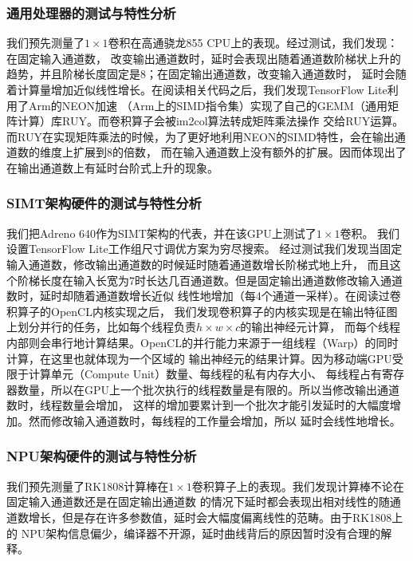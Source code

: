 \subsubsection{通用处理器的测试与特性分析}
我们预先测量了$1\times 1$卷积在高通骁龙855 CPU上的表现。经过测试，我们发现：在固定输入通道数，
改变输出通道数时，延时会表现出随着通道数阶梯状上升的趋势，并且阶梯长度固定是8；在固定输出通道数，改变输入通道数时，
延时会随着计算量增加近似线性增长。在阅读相关代码之后，我们发现TensorFlow Lite利用了Arm的NEON加速
（Arm上的SIMD指令集）实现了自己的GEMM（通用矩阵计算）库RUY。而卷积算子会被im2col算法转成矩阵乘法操作
交给RUY运算。而RUY在实现矩阵乘法的时候，为了更好地利用NEON的SIMD特性，会在输出通道数的维度上扩展到8的倍数，
而在输入通道数上没有额外的扩展。因而体现出了在输出通道数上有延时台阶式上升的现象。

\subsubsection{SIMT架构硬件的测试与特性分析}
我们把Adreno 640作为SIMT架构的代表，并在该GPU上测试了$1\times 1$卷积。
我们设置TensorFlow Lite工作组尺寸调优方案为穷尽搜索。
经过测试我们发现当固定输入通道数，修改输出通道数的时候延时随着通道数增长阶梯式地上升，
而且这个阶梯长度在输入长宽为7时长达几百通道数。但是固定输出通道数修改输入通道数时，延时却随着通道数增长近似
线性地增加（每4个通道一采样）。在阅读过卷积算子的OpenCL内核实现之后，
我们发现卷积算子的内核实现是在输出特征图上划分并行的任务，比如每个线程负责$h\times w\times c$的输出神经元计算，
而每个线程内部则会串行地计算结果。OpenCL的并行能力来源于一组线程（Warp）的同时计算，在这里也就体现为一个区域的
输出神经元的结果计算。因为移动端GPU受限于计算单元（Compute Unit）数量、每线程的私有内存大小、
每线程占有寄存器数量，所以在GPU上一个批次执行的线程数量是有限的。所以当修改输出通道数时，线程数量会增加，
这样的增加要累计到一个批次才能引发延时的大幅度增加。然而修改输入通道数时，每线程的工作量会增加，所以
延时会线性地增长。

\subsubsection{NPU架构硬件的测试与特性分析}
我们预先测量了RK1808计算棒在$1\times 1$卷积算子上的表现。我们发现计算棒不论在固定输入通道数还是在固定输出通道数
的情况下延时都会表现出相对线性的随通道数增长，但是存在许多参数值，延时会大幅度偏离线性的范畴。由于RK1808上的
NPU架构信息偏少，编译器不开源，延时曲线背后的原因暂时没有合理的解释。